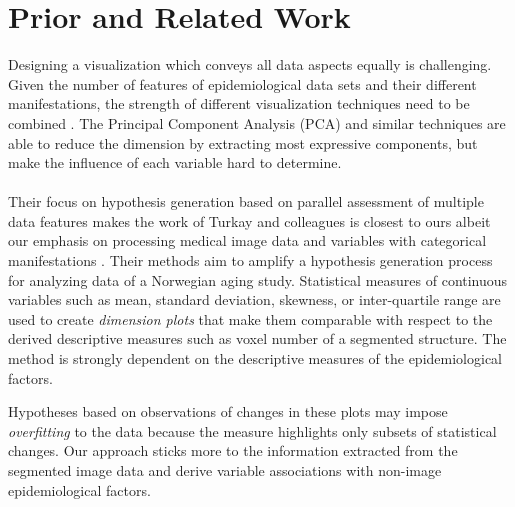 \documentclass[journal]{style/vgtc} 			          %
\begin{document}
\section{Prior and Related Work}
Designing a visualization which conveys all data aspects equally is challenging.
%
Given the number of features of epidemiological data sets and their different manifestations, the strength of different visualization techniques need to be combined \cite{Buja91, Konyha2009}.
%
The Principal Component Analysis (PCA) and similar techniques are able to reduce the dimension by extracting most expressive components, but make the influence of each variable hard to determine.
\\\\
Their focus on hypothesis generation based on parallel assessment of multiple data features makes the work of Turkay and colleagues is closest to ours albeit our emphasis on processing medical image data and variables with categorical manifestations \cite{Turkay2013}.
%
Their methods aim to amplify a hypothesis generation process for analyzing data of a Norwegian aging study.
%
Statistical measures of continuous variables such as mean, standard deviation, skewness, or inter-quartile range are used to create \emph{dimension plots} that make them comparable with respect to the derived descriptive measures such as voxel number of a segmented structure.
%
%
%
%
%
The method is strongly dependent on the descriptive measures of the epidemiological factors.

Hypotheses based on observations of changes in these plots may impose \emph{overfitting} to the data because the measure highlights only subsets of statistical changes.
%
Our approach sticks more to the information extracted from the segmented image data and derive variable associations with non-image epidemiological factors.
\end{document}
